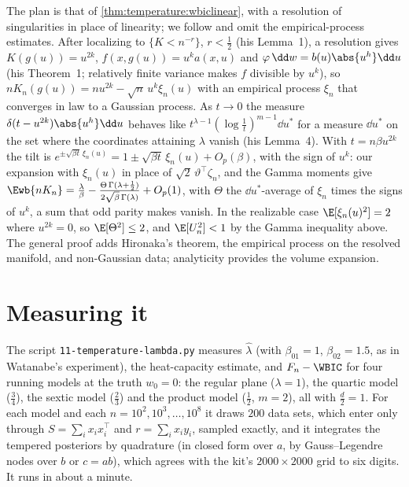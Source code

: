 \begin{refsection}
\begin{proofsketch}
The plan is that of \cref{thm:temperature:wbiclinear}, with a resolution of singularities in place of linearity; we follow \textcite[\S5]{Watanabe2013} and omit the empirical-process estimates. After localizing to $\{K<n^{-r}\}$, $r<\frac12$ (his Lemma~1), a resolution gives $K(g(u))=u^{2k}$, $f(x,g(u))=u^ka(x,u)$ and $\varphi\,\dd w=b(u)\abs{u^h}\dd u$ (his Theorem~1; relatively finite variance makes $f$ divisible by $u^k$), so $nK_n(g(u))=nu^{2k}-\sqrt n\,u^k\xi_n(u)$ with an empirical process $\xi_n$ that converges in law to a Gaussian process. As $t\to0$ the measure $\delta(t-u^{2k})\abs{u^h}\dd u$ behaves like $t^{\lambda-1}(\log\frac1t)^{m-1}\dd u^*$ for a measure $\dd u^*$ on the set where the coordinates attaining $\lambda$ vanish (his Lemma~4). With $t=n\beta u^{2k}$ the tilt is $e^{\pm\sqrt{\beta t}\,\xi_n(u)}=1\pm\sqrt{\beta t}\,\xi_n(u)+O_p(\beta)$, with the sign of $u^k$: our expansion with $\xi_n(u)$ in place of $\sqrt2\,\vartheta^\top\zeta_n$, and the Gamma moments give $\Ewb{nK_n}=\frac\lambda\beta-\frac{\Theta\,\Gamma(\lambda+\frac12)}{2\sqrt\beta\,\Gamma(\lambda)}+O_p(1)$, with $\Theta$ the $\dd u^*$-average of $\xi_n$ times the signs of $u^k$, a sum that odd parity makes vanish. In the realizable case $\E[\xi_n(u)^2]=2$ where $u^{2k}=0$, so $\E[\Theta^2]\le2$, and $\E[U_n^2]<1$ by the Gamma inequality above. The general proof adds Hironaka's theorem, the empirical process on the resolved manifold, and non-Gaussian data; analyticity provides the volume expansion.
\end{proofsketch}

\section{Measuring it}\label{sec:temperature:measuring}

The script \texttt{11-temperature-lambda.py} measures $\hat\lambda$ (with $\beta_{01}=1$, $\beta_{02}=1.5$, as in Watanabe's experiment), the heat-capacity estimate, and $F_n-\WBIC$ for four running models at the truth $w_0=0$: the regular plane ($\lambda=1$), the quartic model ($\frac34$), the sextic model ($\frac23$) and the product model ($\frac12$, $m=2$), all with $\frac d2=1$. For each model and each $n=10^2,10^3,\dots,10^8$ it draws $200$ data sets, which enter only through $S=\sum_ix_ix_i^\top$ and $r=\sum_ix_iy_i$, sampled exactly, and it integrates the tempered posteriors by quadrature (in closed form over $a$, by Gauss--Legendre nodes over $b$ or $c=ab$), which agrees with the kit's $2000\times2000$ grid to six digits. It runs in about a minute.


\end{refsection}
